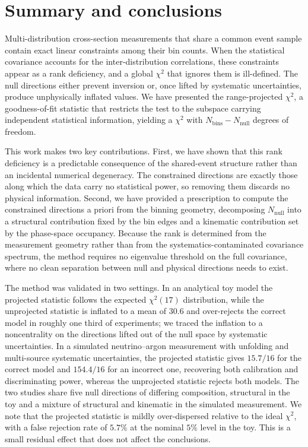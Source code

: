 \documentclass[a4paper,11pt]{article}
\begin{document}
\section{Summary and conclusions}
\label{sec:conclusions}

Multi-distribution cross-section measurements that share a common event sample contain exact linear constraints among their bin counts. When the statistical covariance accounts for the inter-distribution correlations, these constraints appear as a rank deficiency, and a global $\chi^{2}$ that ignores them is ill-defined. The null directions either prevent inversion or, once lifted by systematic uncertainties, produce unphysically inflated values. We have presented the range-projected $\chi^{2}$, a goodness-of-fit statistic that restricts the test to the subspace carrying independent statistical information, yielding a $\chi^{2}$ with $N_{\text{bins}} - N_{\text{null}}$ degrees of freedom.

This work makes two key contributions. First, we have shown that this rank deficiency is a predictable consequence of the shared-event structure rather than an incidental numerical degeneracy. The constrained directions are exactly those along which the data carry no statistical power, so removing them discards no physical information. Second, we have provided a prescription to compute the constrained directions a priori from the binning geometry, decomposing $N_{\text{null}}$ into a structural contribution fixed by the bin edges and a kinematic contribution set by the phase-space occupancy. Because the rank is determined from the measurement geometry rather than from the systematics-contaminated covariance spectrum, the method requires no eigenvalue threshold on the full covariance, where no clean separation between null and physical directions needs to exist.

The method was validated in two settings. In an analytical toy model the projected statistic follows the expected $\chi^{2}(17)$ distribution, while the unprojected statistic is inflated to a mean of $30.6$ and over-rejects the correct model in roughly one third of experiments; we traced the inflation to a noncentrality on the directions lifted out of the null space by systematic uncertainties. In a simulated neutrino--argon measurement with unfolding and multi-source systematic uncertainties, the projected statistic gives $15.7/16$ for the correct model and $154.4/16$ for an incorrect one, recovering both calibration and discriminating power, whereas the unprojected statistic rejects both models. The two studies share five null directions of differing composition, structural in the toy and a mixture of structural and kinematic in the simulated measurement. We note that the projected statistic is mildly over-dispersed relative to the ideal $\chi^{2}$, with a false rejection rate of $5.7\%$ at the nominal $5\%$ level in the toy. This is a small residual effect that does not affect the conclusions.
\end{document}
